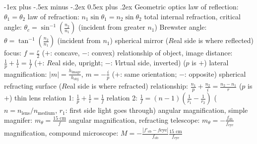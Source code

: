 \documentclass[10pt,landscape]{article}
\makeatletter
\renewcommand{\subsection}{\@startsection{subsection}{2}{0mm}%
                                {-1ex plus -.5ex minus -.2ex}%
                                {0.5ex plus .2ex}%
                                {\normalfont\normalsize\bfseries}}
\newcommand{\spc}{\hspace*{1em}}
\makeatother
\begin{document}
\begin{multicols}{3}
\subsection{Geometric optics}
law of reflection: $\theta _1=\theta _2$
\newline
law of refraction: $n_1\sin \theta _1=n_2\sin \theta _2$
\newline
total internal refraction, critical angle: $\theta _c=\sin^{-1}(\frac{n_2}{n_1})$ 
\newline
\spc (incident from greater $n_1$)
\newline
Brewster angle: $\theta =\tan^{-1}(\frac{n_2}{n_1})$ (incident from $n_1$)
\newline \newline
spherical mirror ($R$eal side is where reflected)
\newline
\spc focus: $f=\frac{r}{2}$ ($+$: concave, $-$: convex)
\newline
\spc relationship of object, image distance: $\frac{1}{p}+\frac{1}{i}=\frac{1}{f}$ 
\newline
\spc \spc($+$: $R$eal side, upright; $-$: $V$irtual side, inverted) ($p$ is $+$)
\newline
\spc lateral magnification: $|m|=\frac{h_{\textrm{image}}}{h_{\textrm{obj}}}$, $m=-\frac{i}{p}$ 
\newline
\spc \spc($+$: same orientation; $-$: opposite)
\newline
spherical refracting surface ($R$eal side is where refracted)
\newline
\spc relationship: $\frac{n_1}{p}+\frac{n_2}{i}=\frac{n_2-n_1}{r}$ ($p$ is $+$)
\newline \newline
thin lens
\newline
\spc relation 1: $\frac{1}{p}+\frac{1}{i}=\frac{1}{f}$
\newline
\spc relation 2: $\frac{1}{f}=(n-1)(\frac{1}{r_1}-\frac{1}{r_2})$
\newline
\spc \spc ($n=n_{\textrm{lens}}/n_{\textrm{medium}}$, $r_1$: first side light goes through)
\newline \newline
angular magnification, simple magnifer: $m_\theta =\frac{15\textrm{ cm}}{f}$
\newline
angular magnification, refracting telescope: $m_\theta =-\frac{f_{\textrm{ob}}}{f_{\textrm{eye}}}$
\newline
magnification, compound microscope: $M=-\frac{|f'_{\textrm{ob}}-f{\textrm{eye}}|}{f_{\textrm{ob}}}\frac{15\textrm{ cm}}{f_{\textrm{eye}}}$ 


\end{multicols}
\end{document}
